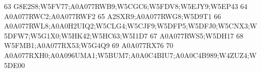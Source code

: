 \documentclass{beamer}
\begin{document}
\begin{frame}[fragile]
\begin{itemize}
\begin{Schunk}
\begin{Soutput}
63                                                                                                                                                                                                                                                                                                                           G8E2S8;W5FV77;A0A077RWB9;W5CGC6;W5FDV8;W5EJY9;W5EP43
64                                                                                                                                                                                                                                                                                                                                                          A0A077RWC2;A0A077RWF2
65                                                                                                                                                                                                                                                                                                                                                       A2SXR9;A0A077RWG8;W5D9T1
66                                                                                                                                                                                                                                                                                    A0A077RWL8;A0A0H2UIQ2;W5CLG4;W5CJF9;W5DFP5;W5DFJ0;W5CNX3;W5DFW7;W5G1X0;W5HK42;W5HC63;W5I1D7
67                                                                                                                                                                                                                                                                                                                                                              A0A077RWS5;W5DH17
68                                                                                                                                                                                                                                                                                                                                                       W5FMB1;A0A077RX53;W5G4Q9
69                                                                                                                                                                                                                                                                                                                                                                     A0A077RX76
70                                                                                                                                                                                                                                                                                                               A0A077RXH0;A0A096UMA1;W5BUM7;A0A0C4BIU7;A0A0C4B989;W4ZUZ4;W5DE00

\end{Soutput}
\end{Schunk}
\end{itemize}
\end{frame}
\end{document}
